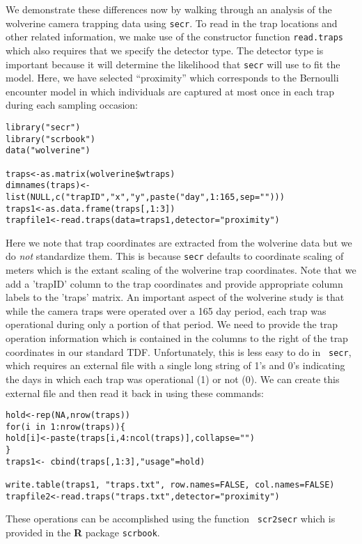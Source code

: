 We demonstrate these differences now by
walking through an analysis of the wolverine camera trapping data
using  \mbox{\tt secr}.
To read in
the trap locations and other related information, we make use of the
constructor function \mbox{\tt read.traps} which also requires that we
specify the detector type.
The
detector type is important because it will determine the likelihood
that \mbox{\tt secr} will use to fit the model.  Here, we have
selected ``proximity'' which corresponds to the Bernoulli encounter
model in which individuals are captured at most once in each trap
during each sampling occasion: 
{\small
\begin{verbatim}
library("secr")
library("scrbook")
data("wolverine")

traps<-as.matrix(wolverine$wtraps)
dimnames(traps)<-list(NULL,c("trapID","x","y",paste("day",1:165,sep="")))
traps1<-as.data.frame(traps[,1:3])
trapfile1<-read.traps(data=traps1,detector="proximity")
\end{verbatim}
}
Here we note that trap coordinates are extracted from the wolverine
data but we do {\it not} standardize them. This is because
\mbox{\tt secr} defaults to coordinate scaling of meters which is the
extant scaling of the wolverine trap coordinates. Note that we add a 'trapID' column to
the trap coordinates and provide appropriate column labels to the
'traps' matrix. 
An important aspect of the
wolverine study is that while the camera traps were operated over a
165 day period, each trap was operational during only a portion of
that period. We need to provide the trap operation information which
is contained in the columns to the right of the trap coordinates in
our standard TDF. Unfortunately, this is less easy to do in \mbox{\tt
  secr}, which requires an external file with a single long string of
1's and 0's indicating the days in which each trap was operational (1)
or not (0). We can create this external file and then read it back in
using these commands:
\begin{verbatim}
hold<-rep(NA,nrow(traps))
for(i in 1:nrow(traps)){
hold[i]<-paste(traps[i,4:ncol(traps)],collapse="")
}
traps1<- cbind(traps[,1:3],"usage"=hold)

write.table(traps1, "traps.txt", row.names=FALSE, col.names=FALSE)
trapfile2<-read.traps("traps.txt",detector="proximity") 
\end{verbatim}
These operations can be accomplished using the function \mbox{\tt
  scr2secr} which is provided in the {\bf R} package \mbox{\tt scrbook}.

